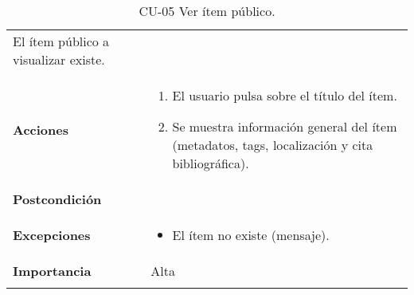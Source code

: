 \begin{longtable}[]{@{}ll@{}}
\begin{minipage}[t]{0.74\columnwidth}
El ítem público a visualizar existe.\strut
\end{minipage}\tabularnewline
\begin{minipage}[t]{0.20\columnwidth}\raggedright
\textbf{Acciones}\strut
\end{minipage} & \begin{minipage}[t]{0.74\columnwidth}\raggedright
\begin{enumerate}
\def\labelenumi{\arabic{enumi}.}
\tightlist
\item
  El usuario pulsa sobre el título del ítem.
\item
  Se muestra información general del ítem (metadatos, tags, localización
  y cita bibliográfica).
\end{enumerate}\strut
\end{minipage}\tabularnewline
\begin{minipage}[t]{0.20\columnwidth}\raggedright
\textbf{Postcondición}\strut
\end{minipage} & \begin{minipage}[t]{0.74\columnwidth}\raggedright
\strut
\end{minipage}\tabularnewline
\begin{minipage}[t]{0.20\columnwidth}\raggedright
\textbf{Excepciones}\strut
\end{minipage} & \begin{minipage}[t]{0.74\columnwidth}\raggedright
\begin{itemize}
\tightlist
\item
  El ítem no existe (mensaje).
\end{itemize}\strut
\end{minipage}\tabularnewline
\begin{minipage}[t]{0.20\columnwidth}\raggedright
\textbf{Importancia}\strut
\end{minipage} & \begin{minipage}[t]{0.74\columnwidth}\raggedright
Alta\strut
\end{minipage}\tabularnewline
\bottomrule
\caption{CU-05 Ver ítem público.}
\end{longtable}

